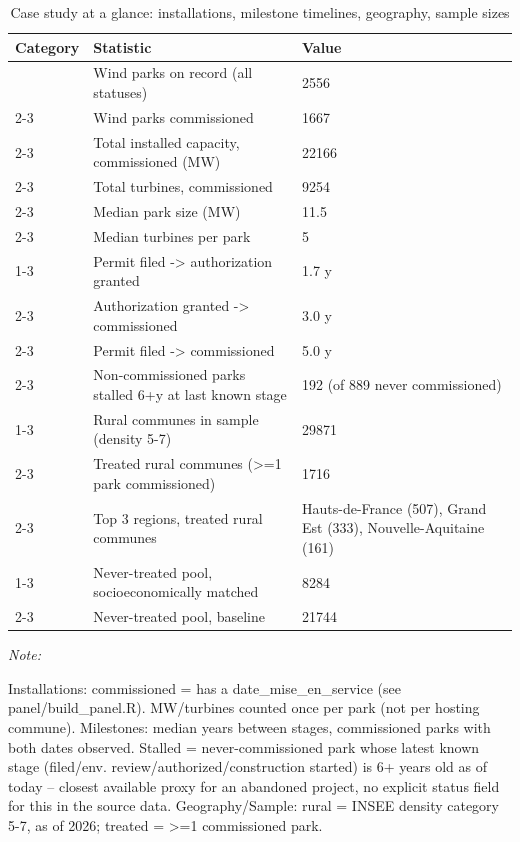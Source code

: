 \begin{table}[!h]
\centering
\caption{\label{tab:tab:descriptive_stats}Case study at a glance: installations, milestone timelines, geography, sample sizes}
\centering
\fontsize{9}{11}\selectfont
\begin{threeparttable}
\begin{tabular}[t]{lll}
\toprule
Category & Statistic & Value\\
\midrule
 & Wind parks on record (all statuses) & 2556\\
\cmidrule{2-3}
 & Wind parks commissioned & 1667\\
\cmidrule{2-3}
 & Total installed capacity, commissioned (MW) & 22166\\
\cmidrule{2-3}
 & Total turbines, commissioned & 9254\\
\cmidrule{2-3}
 & Median park size (MW) & 11.5\\
\cmidrule{2-3}
\multirow[t]{-6}{*}{\raggedright\arraybackslash Installations} & Median turbines per park & 5\\
\cmidrule{1-3}
 & Permit filed -> authorization granted & 1.7 y\\
\cmidrule{2-3}
 & Authorization granted -> commissioned & 3.0 y\\
\cmidrule{2-3}
 & Permit filed -> commissioned & 5.0 y\\
\cmidrule{2-3}
\multirow[t]{-4}{*}{\raggedright\arraybackslash Milestones} & Non-commissioned parks stalled 6+y at last known stage & 192 (of 889 never commissioned)\\
\cmidrule{1-3}
 & Rural communes in sample (density 5-7) & 29871\\
\cmidrule{2-3}
 & Treated rural communes (>=1 park commissioned) & 1716\\
\cmidrule{2-3}
\multirow[t]{-3}{*}{\raggedright\arraybackslash Geography} & Top 3 regions, treated rural communes & Hauts-de-France (507), Grand Est (333), Nouvelle-Aquitaine (161)\\
\cmidrule{1-3}
 & Never-treated pool, socioeconomically matched & 8284\\
\cmidrule{2-3}
\multirow[t]{-2}{*}{\raggedright\arraybackslash Sample} & Never-treated pool, baseline & 21744\\
\bottomrule
\end{tabular}
\begin{tablenotes}
\item \textit{Note: } 
\item Installations: commissioned = has a date_mise_en_service (see panel/build_panel.R). MW/turbines counted once per park (not per hosting commune). Milestones: median years between stages, commissioned parks with both dates observed. Stalled = never-commissioned park whose latest known stage (filed/env. review/authorized/construction started) is 6+ years old as of today -- closest available proxy for an abandoned project, no explicit status field for this in the source data. Geography/Sample: rural = INSEE density category 5-7, as of 2026; treated = >=1 commissioned park.
\end{tablenotes}
\end{threeparttable}
\end{table}

